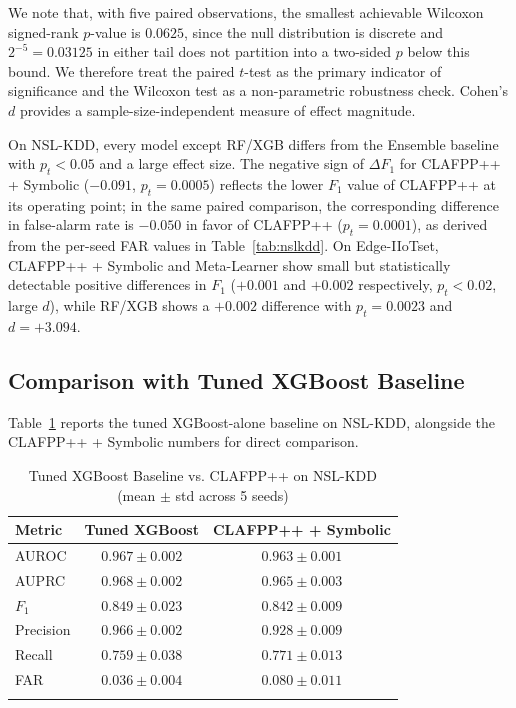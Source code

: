 \documentclass[pdflatex,sn-mathphys-num]{sn-jnl}
\theoremstyle{thmstyleone}
\theoremstyle{thmstyletwo}
\theoremstyle{thmstylethree}
\begin{document}
We note that, with five paired observations, the smallest achievable Wilcoxon signed-rank $p$-value is $0.0625$, since the null distribution is discrete and $2^{-5} = 0.03125$ in either tail does not partition into a two-sided $p$ below this bound. We therefore treat the paired $t$-test as the primary indicator of significance and the Wilcoxon test as a non-parametric robustness check. Cohen's $d$ provides a sample-size-independent measure of effect magnitude.

On NSL-KDD, every model except RF/XGB differs from the Ensemble baseline with $p_t < 0.05$ and a large effect size. The negative sign of $\Delta F_1$ for CLAFPP++ + Symbolic ($-0.091$, $p_t = 0.0005$) reflects the lower $F_1$ value of CLAFPP++ at its operating point; in the same paired comparison, the corresponding difference in false-alarm rate is $-0.050$ in favor of CLAFPP++ ($p_t = 0.0001$), as derived from the per-seed FAR values in Table~\ref{tab:nslkdd}. On Edge-IIoTset, CLAFPP++ + Symbolic and Meta-Learner show small but statistically detectable positive differences in $F_1$ ($+0.001$ and $+0.002$ respectively, $p_t < 0.02$, large $d$), while RF/XGB shows a $+0.002$ difference with $p_t = 0.0023$ and $d = +3.094$.

\subsection{Comparison with Tuned XGBoost Baseline}\label{sec:results-baseline}

Table~\ref{tab:xgboost} reports the tuned XGBoost-alone baseline on NSL-KDD, alongside the CLAFPP++ + Symbolic numbers for direct comparison.

\begin{table}[!ht]
\centering
\caption{Tuned XGBoost Baseline vs. CLAFPP++ on NSL-KDD (mean $\pm$ std across 5 seeds)}\label{tab:xgboost}
\begin{tabular}{lcc}
\toprule
\textbf{Metric} & \textbf{Tuned XGBoost} & \textbf{CLAFPP++ + Symbolic} \\
\midrule
AUROC          & $0.967 \pm 0.002$ & $0.963 \pm 0.001$ \\
AUPRC          & $0.968 \pm 0.002$ & $0.965 \pm 0.003$ \\
$F_1$          & $0.849 \pm 0.023$ & $0.842 \pm 0.009$ \\
Precision      & $0.966 \pm 0.002$ & $0.928 \pm 0.009$ \\
Recall         & $0.759 \pm 0.038$ & $0.771 \pm 0.013$ \\
FAR            & $0.036 \pm 0.004$ & $0.080 \pm 0.011$ \\
\botrule
\end{tabular}
\end{table}
\end{document}
